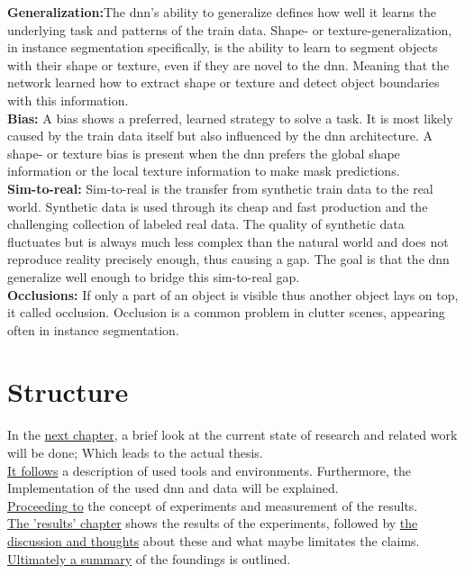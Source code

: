 		\textbf{Generalization:}The \ac{dnn}'s ability to generalize defines how well it learns the underlying task and patterns of the train data. Shape- or texture-generalization, in instance segmentation specifically, is the ability to learn to segment objects with their shape or texture, even if they are novel to the \ac{dnn}. Meaning that the network learned how to extract shape or texture and detect object boundaries with this information. \\
		\textbf{Bias:} A bias shows a preferred, learned strategy to solve a task. It is most likely caused by the train data itself but also influenced by the \ac{dnn} architecture. A shape- or texture bias is present when the \ac{dnn} prefers the global shape information or the local texture information to make mask predictions.\\
		\textbf{Sim-to-real:} Sim-to-real is the transfer from synthetic train data to the real world. Synthetic data is used through its cheap and fast production and the challenging collection of labeled real data. The quality of synthetic data fluctuates but is always much less complex than the natural world and does not reproduce reality precisely enough, thus causing a gap. The goal is that the \ac{dnn} generalize well enough to bridge this sim-to-real gap.\\
		\textbf{Occlusions:} If only a part of an object is visible thus another object lays on top, it called occlusion. Occlusion is a common problem in clutter scenes, appearing often in instance segmentation.
	
	
	
	\section{Structure}
	\label{sec:structure}
		In the \hyperref[chap:kapitel2]{next chapter}, a brief look at the current state of research and related work will be done; Which leads to the actual thesis.\\
		\hyperref[chap:kapitel3]{It follows} a description of used tools and environments. Furthermore, the Implementation of the used \ac{dnn} and data will be explained.\\
		\hyperref[chap:kapitel4]{Proceeding to} the concept of experiments and measurement of the results.\\
		\hyperref[chap:kapitel5]{The 'results' chapter} shows the results of the experiments, followed by \hyperref[chap:kapitel6]{the discussion and thoughts} about these and what maybe limitates the claims.\\
		\hyperref[chap:kapitel7]{Ultimately a summary} of the foundings is outlined.
		





